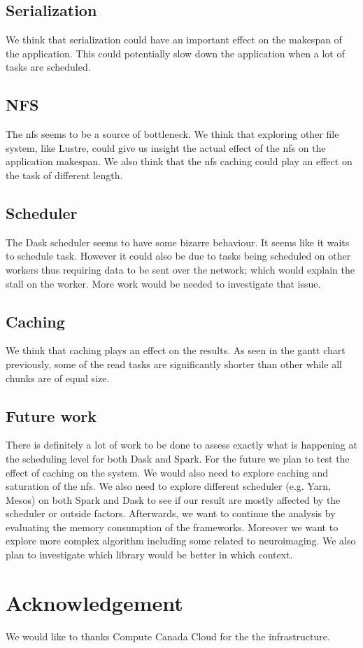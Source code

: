 \documentclass[11pt,a4paper]{article}
\begin{document}
\subsection{Serialization}
We think that serialization could have an important effect on the makespan of the application. This could potentially slow down the application when a lot of tasks are scheduled.

\subsection{NFS}
The nfs seems to be a source of bottleneck. We think that exploring other file system, like Lustre, could give us insight the actual effect of the nfs on the application makespan. We also think that the nfs caching could play an effect on the task of different length.

\subsection{Scheduler}
The Dask scheduler seems to have some bizarre behaviour. It seems like it waits to schedule task. However it could also be due to tasks being scheduled on other workers thus requiring data to be sent over the network; which would explain the stall on the worker. More work would be needed to investigate that issue.


\subsection{Caching}
We think that caching plays an effect on the results. As seen in the gantt chart previously, some of the read tasks are significantly shorter than other while all chunks are of equal size.



\subsection{Future work}
There is definitely a lot of work to be done to assess exactly what is happening at the scheduling level for both Dask and Spark. For the future we plan to test the effect of caching on the system. We would also need to explore caching and saturation of the nfs. We also need to explore different scheduler (e.g. Yarn, Mesos) on both Spark and Dask to see if our result are mostly affected by the scheduler or outside factors. Afterwards, we want to continue the analysis by evaluating the memory consumption of the frameworks. Moreover we want to explore more complex algorithm including some related to neuroimaging. We also plan to investigate which library would be better in which context.

\section{Acknowledgement}
We would like to thanks Compute Canada Cloud for the the infrastructure.



\end{document}
